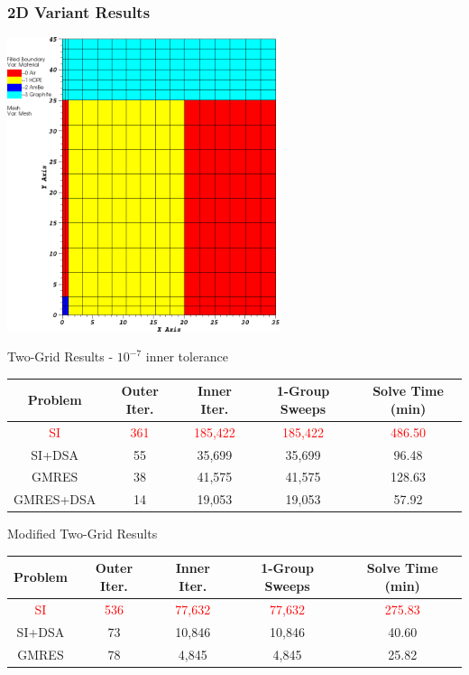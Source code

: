 \documentclass[compress,10pt]{beamer}
\newcommand{\tcr}[1]{\textcolor{red}{#1}}
\begin{document}
\begin{frame}[t]\frametitle{2D Variant Results}{\footnotesize
{}
{
\hspace*{1.75cm}
{}\includegraphics[width=0.60\textwidth]{images/2D_IM1_Variant_Layout.png}
}
{
\begin{block}{Two-Grid Results - $10^{-7}$ inner tolerance}
\begin{table}
\begin{tabular}{|c|c|c|c|c|}
\hline
Problem & Outer Iter. & Inner Iter. & 1-Group Sweeps & Solve Time (min)  \\
\hline \hline
\tcr{SI} & \tcr{361} & \tcr{185,422} &\tcr{185,422}  &  \tcr{486.50} \\ \hline
SI+DSA & 55 & 35,699 & 35,699 &  96.48 \\ \hline
GMRES & 38 & 41,575 & 41,575 &  128.63 \\ \hline
GMRES+DSA & 14 & 19,053 & 19,053  & 57.92  \\ \hline
\end{tabular}
\end{table}
\end{block}
\vspace{-3mm}
\begin{block}{Modified Two-Grid Results}
\begin{table}
\begin{tabular}{|c|c|c|c|c|}
\hline
Problem & Outer Iter. & Inner Iter. & 1-Group Sweeps & Solve Time (min)  \\
\hline \hline
\tcr{SI} & \tcr{536} & \tcr{77,632} & \tcr{77,632} & \tcr{275.83}  \\ \hline
SI+DSA & 73 & 10,846 & 10,846 &  40.60 \\ \hline
GMRES & 78 & 4,845 & 4,845 &  25.82 \\ \hline

\end{tabular}
\end{table}
\end{block}}}
\end{frame}
\end{document}
